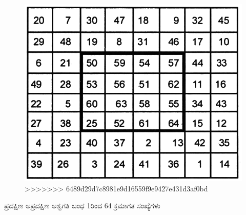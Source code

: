 \begin{figure}[H]
\includegraphics[scale=0.9]{src/figures/chap6/fig6.22.jpg}
>>>>>>> 6489d29d7c8981e9d16559f9e9427e431d3af0bd
\end{figure}

ಪ್ರದಕ್ಷಿಣ ಅಪ್ರದಕ್ಷಿಣ ಅಶ್ವಗತಿ ಬಂಧ 1ರಿಂದ 64 ಕ್ರಮಾಗತ ಸಂಖ್ಯೆಗಳು

